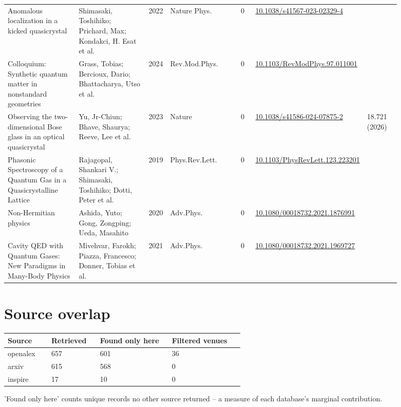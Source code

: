 \documentclass[10pt,a4paper]{article}
\begin{document}
{\begin{longtable}{p{0.192\linewidth}p{0.192\linewidth}p{0.043\linewidth}p{0.192\linewidth}p{0.043\linewidth}p{0.132\linewidth}p{0.096\linewidth}}
Anomalous localization in a kicked quasicrystal & Shimasaki, Toshihiko; Prichard, Max; Kondakci, H. Esat et al. & 2022 & Nature Phys. & 0 & \href{https://doi.org/10.1038/s41567-023-02329-4}{10.1038/s41567-023-02329-4} &  \\
Colloquium: Synthetic quantum matter in nonstandard geometries & Grass, Tobias; Bercioux, Dario; Bhattacharya, Utso et al. & 2024 & Rev.Mod.Phys. & 0 & \href{https://doi.org/10.1103/RevModPhys.97.011001}{10.1103/RevModPhys.97.011001} &  \\
Observing the two-dimensional Bose glass in an optical quasicrystal & Yu, Jr-Chiun; Bhave, Shaurya; Reeve, Lee et al. & 2023 & Nature & 0 & \href{https://doi.org/10.1038/s41586-024-07875-2}{10.1038/s41586-024-07875-2} & 18.721 (2026) \\
Phasonic Spectroscopy of a Quantum Gas in a Quasicrystalline Lattice & Rajagopal, Shankari V.; Shimasaki, Toshihiko; Dotti, Peter et al. & 2019 & Phys.Rev.Lett. & 0 & \href{https://doi.org/10.1103/PhysRevLett.123.223201}{10.1103/PhysRevLett.123.223201} &  \\
Non-Hermitian physics & Ashida, Yuto; Gong, Zongping; Ueda, Masahito & 2020 & Adv.Phys. & 0 & \href{https://doi.org/10.1080/00018732.2021.1876991}{10.1080/00018732.2021.1876991} &  \\
Cavity QED with Quantum Gases: New Paradigms in Many-Body Physics & Mivehvar, Farokh; Piazza, Francesco; Donner, Tobias et al. & 2021 & Adv.Phys. & 0 & \href{https://doi.org/10.1080/00018732.2021.1969727}{10.1080/00018732.2021.1969727} &  \\
\hline
\end{longtable}}
\section*{Source overlap}
{\scriptsize\begin{longtable}{p{0.177\linewidth}p{0.192\linewidth}p{0.280\linewidth}p{0.280\linewidth}}
\hline
\textbf{Source} & \textbf{Retrieved} & \textbf{Found only here} & \textbf{Filtered venues} \\ \hline
\endhead
openalex & 657 & 601 & 36 \\
arxiv & 615 & 568 & 0 \\
inspire & 17 & 10 & 0 \\
\hline
\end{longtable}}
'Found only here' counts unique records no other source returned -- a measure of each database's marginal contribution.
\end{document}
